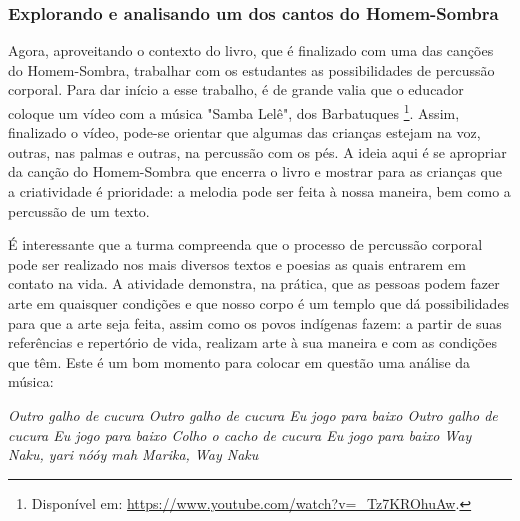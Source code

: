 \documentclass[11pt]{extarticle}
\begin{document}
\subsubsection{Explorando e analisando um dos cantos do Homem-Sombra}


Agora, aproveitando o contexto do livro, que é finalizado com uma das canções do Homem-Sombra, trabalhar com os estudantes as possibilidades de percussão corporal. Para dar início a esse trabalho, é de grande valia que o educador coloque um vídeo com a música "Samba Lelê", dos Barbatuques \footnote{Disponível em: \url{https://www.youtube.com/watch?v=_Tz7KROhuAw}.}. Assim, finalizado o vídeo, pode-se orientar que algumas das crianças estejam na voz, outras, nas palmas e outras, na percussão com os pés. A ideia aqui é se apropriar da canção do Homem-Sombra que encerra o livro e mostrar para as crianças que a criatividade é prioridade: a melodia pode ser feita à nossa maneira, bem como a percussão de um texto. 




É interessante que a turma compreenda que o processo de percussão corporal pode ser realizado nos mais diversos textos e poesias as quais entrarem em contato na vida. A atividade demonstra, na prática, que as pessoas podem fazer arte em quaisquer condições e que nosso corpo é um templo que dá possibilidades para que a arte seja feita, assim como os povos indígenas fazem: a partir de suas referências e repertório de vida, realizam arte à sua maneira e com as condições que têm. Este é um bom momento para colocar em questão uma análise da música: 

\textit{Outro galho de cucura
Outro galho de cucura
Eu jogo para baixo
Outro galho de cucura
Eu jogo para baixo
Colho o cacho de cucura
Eu jogo para baixo
Way Naku, yari nóóy mah
Marika, Way Naku}
\end{document}
